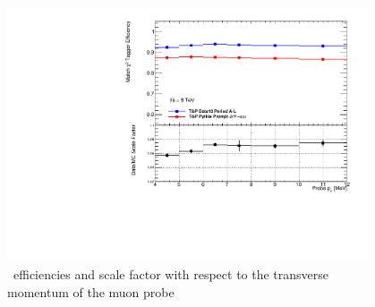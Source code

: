 \begin{figure}[htbp]
  \centering
  \includegraphics[width=0.95\textwidth]{PartCalibration2012/Plots/SFPlots/pt_smt.pdf}
  \caption{\xsm\ efficiencies and scale factor with respect to the transverse momentum of the muon probe} \label{fig:CalibrationMomentumResults}
\end{figure}


